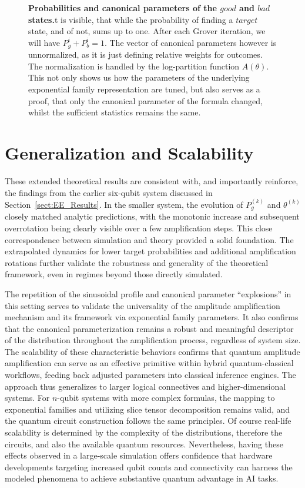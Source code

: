 \documentclass[encoding=utf8,british]{tumphthesis}
\begin{document}
\begin{figure}[H]
            \caption{\textbf{Probabilities and canonical parameters of the $good$ and $bad$ states.}t is visible, that while the probability of finding a $target$ state, and of not, sums up to one. After each Grover iteration,
            we will have $P_g^i + P_b^i = 1$. The vector of canonical parameters however is unnormalized, as it is just defining relative weights for outcomes.
            The normalization is handled by the log-partition function $A(\theta)$. This not only shows us how the parameters of the underlying exponential family representation are tuned,
            but also serves as a proof, that only the canonical parameter of the formula changed, whilst the sufficient statistics remains the same.}
            \label{fig:can_gb_2}

            \end{figure}

            

    \section{Generalization and Scalability}
    These extended theoretical results are consistent with, and importantly reinforce, the findings from the earlier six-qubit system discussed in Section~\ref{sect:EE_Results}. In the smaller system, 
    the evolution of $P_g^{(k)}$ and $\theta^{(k)}$ closely matched analytic predictions, with the monotonic increase and subsequent overrotation being clearly visible over a few amplification steps. 
    This close correspondence between simulation and theory provided a solid foundation. The extrapolated dynamics for lower target probabilities and additional amplification rotations further validate 
    the robustness and generality of the theoretical framework, even in regimes beyond those directly simulated.

    The repetition of the sinusoidal profile and canonical parameter “explosions” in this setting serves to validate the universality of the amplitude amplification mechanism and its framework via 
    exponential family parameters. It also confirms that the canonical parameterization remains a robust and meaningful descriptor of the distribution throughout the amplification process, regardless 
    of system size. The scalability of these characteristic behaviors confirms that quantum amplitude 
    amplification can serve as an effective primitive within hybrid quantum-classical workflows, feeding back adjusted parameters into classical inference engines.
    The approach thus generalizes to larger logical connectives and higher-dimensional systems. For $n$-qubit systems with more complex formulas, 
    the mapping to exponential families and utilizing slice tensor decomposition remains valid, and the quantum circuit construction follows the same principles.
    Of course real-life scalability is determined by the complexity of the distributions, therefore the circuits, and also the available quantum resources.
    Nevertheless, having these effects observed in a large-scale simulation offers confidence that hardware developments targeting increased qubit counts and connectivity can 
    harness the modeled phenomena to achieve substantive quantum advantage in AI tasks.
\end{document}
